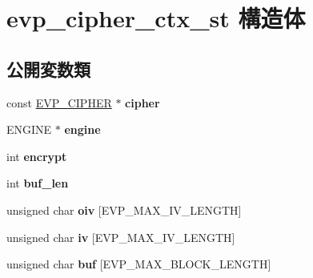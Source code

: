 \hypertarget{structevp__cipher__ctx__st}{}\section{evp\+\_\+cipher\+\_\+ctx\+\_\+st 構造体}
\label{structevp__cipher__ctx__st}
\subsection*{公開変数類}
\begin{DoxyCompactItemize}
\item 
\hypertarget{structevp__cipher__ctx__st_a54860c2aa28ae69bff3ada58996b4bc3}{}const \hyperlink{structevp__cipher__st}{E\+V\+P\+\_\+\+C\+I\+P\+H\+E\+R} $\ast$ {\bfseries cipher}\label{structevp__cipher__ctx__st_a54860c2aa28ae69bff3ada58996b4bc3}

\item 
\hypertarget{structevp__cipher__ctx__st_a1ab6fb61a2574c641f9498c8731715d3}{}E\+N\+G\+I\+N\+E $\ast$ {\bfseries engine}\label{structevp__cipher__ctx__st_a1ab6fb61a2574c641f9498c8731715d3}

\item 
\hypertarget{structevp__cipher__ctx__st_ad6b7abc39f975d0d324be0fef7665cc6}{}int {\bfseries encrypt}\label{structevp__cipher__ctx__st_ad6b7abc39f975d0d324be0fef7665cc6}

\item 
\hypertarget{structevp__cipher__ctx__st_abf70e5abfb9df24c74ad2297c7d53ae0}{}int {\bfseries buf\+\_\+len}\label{structevp__cipher__ctx__st_abf70e5abfb9df24c74ad2297c7d53ae0}

\item 
\hypertarget{structevp__cipher__ctx__st_a9b3a75184a5f5d29fbccf925503fe302}{}unsigned char {\bfseries oiv} \mbox{[}E\+V\+P\+\_\+\+M\+A\+X\+\_\+\+I\+V\+\_\+\+L\+E\+N\+G\+T\+H\mbox{]}\label{structevp__cipher__ctx__st_a9b3a75184a5f5d29fbccf925503fe302}

\item 
\hypertarget{structevp__cipher__ctx__st_a1b3aa9f85ae704113077fb77b5c9db8b}{}unsigned char {\bfseries iv} \mbox{[}E\+V\+P\+\_\+\+M\+A\+X\+\_\+\+I\+V\+\_\+\+L\+E\+N\+G\+T\+H\mbox{]}\label{structevp__cipher__ctx__st_a1b3aa9f85ae704113077fb77b5c9db8b}

\item 
\hypertarget{structevp__cipher__ctx__st_a433caab60fc2419a460e4006b0734352}{}unsigned char {\bfseries buf} \mbox{[}E\+V\+P\+\_\+\+M\+A\+X\+\_\+\+B\+L\+O\+C\+K\+\_\+\+L\+E\+N\+G\+T\+H\mbox{]}\label{structevp__cipher__ctx__st_a433caab60fc2419a460e4006b0734352}


\end{DoxyCompactItemize}
